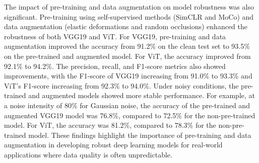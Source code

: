 \documentclass{article}
\begin{document}
The impact of pre-training and data augmentation on model robustness was also significant. Pre-training using self-supervised methods (SimCLR and MoCo) and data augmentation (elastic deformations and random occlusions) enhanced the robustness of both VGG19 and ViT. For VGG19, pre-training and data augmentation improved the accuracy from 91.2\% on the clean test set to 93.5\% on the pre-trained and augmented model. For ViT, the accuracy improved from 92.1\% to 94.2\%. The precision, recall, and F1-score metrics also showed improvements, with the F1-score of VGG19 increasing from 91.0\% to 93.3\% and ViT's F1-score increasing from 92.3\% to 94.0\%. Under noisy conditions, the pre-trained and augmented models showed more stable performance. For example, at a noise intensity of 80\% for Gaussian noise, the accuracy of the pre-trained and augmented VGG19 model was 76.8\%, compared to 72.5\% for the non-pre-trained model. For ViT, the accuracy was 81.2\%, compared to 78.3\% for the non-pre-trained model. These findings highlight the importance of pre-training and data augmentation in developing robust deep learning models for real-world applications where data quality is often unpredictable.



\end{document}
